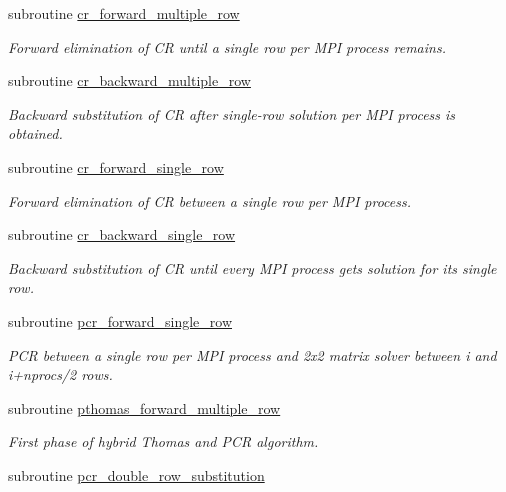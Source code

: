 \begin{DoxyCompactItemize}
subroutine \mbox{\hyperlink{namespacetdma__parallel_afc500f1450d23091f136330208ca4519}{cr\+\_\+forward\+\_\+multiple\+\_\+row}}
\begin{DoxyCompactList}\small\item\em Forward elimination of CR until a single row per M\+PI process remains. \end{DoxyCompactList}\item 
subroutine \mbox{\hyperlink{namespacetdma__parallel_af9df427633cb9dc93aae24114abf95d7}{cr\+\_\+backward\+\_\+multiple\+\_\+row}}
\begin{DoxyCompactList}\small\item\em Backward substitution of CR after single-\/row solution per M\+PI process is obtained. \end{DoxyCompactList}\item 
subroutine \mbox{\hyperlink{namespacetdma__parallel_a33fc3b14caafcdd849e1d4c08e766695}{cr\+\_\+forward\+\_\+single\+\_\+row}}
\begin{DoxyCompactList}\small\item\em Forward elimination of CR between a single row per M\+PI process. \end{DoxyCompactList}\item 
subroutine \mbox{\hyperlink{namespacetdma__parallel_a463b29782692ccfe72b867d5a4b7f2f2}{cr\+\_\+backward\+\_\+single\+\_\+row}}
\begin{DoxyCompactList}\small\item\em Backward substitution of CR until every M\+PI process gets solution for its single row. \end{DoxyCompactList}\item 
subroutine \mbox{\hyperlink{namespacetdma__parallel_aaf75cee6f05e371d59e0d40cb5138192}{pcr\+\_\+forward\+\_\+single\+\_\+row}}
\begin{DoxyCompactList}\small\item\em P\+CR between a single row per M\+PI process and 2x2 matrix solver between i and i+nprocs/2 rows. \end{DoxyCompactList}\item 
subroutine \mbox{\hyperlink{namespacetdma__parallel_a15527e0932190d7abd8b716641de36e8}{pthomas\+\_\+forward\+\_\+multiple\+\_\+row}}
\begin{DoxyCompactList}\small\item\em First phase of hybrid Thomas and P\+CR algorithm. \end{DoxyCompactList}\item 
subroutine \mbox{\hyperlink{namespacetdma__parallel_a438b27a63218775dcccdc41dcb7a6a36}{pcr\+\_\+double\+\_\+row\+\_\+substitution}}

\end{DoxyCompactItemize}

